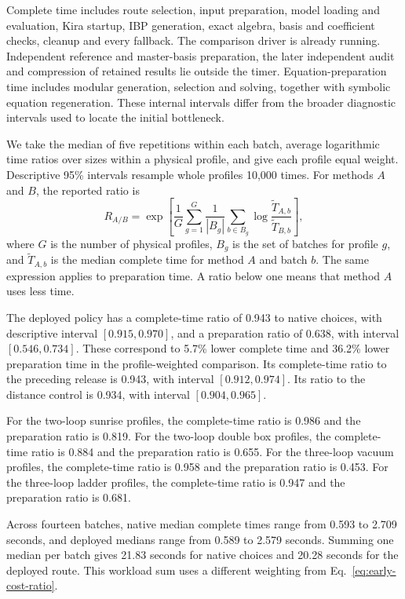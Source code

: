 Complete time includes route selection, input preparation, model loading
and evaluation, Kira startup, IBP generation, exact algebra, basis and
coefficient checks, cleanup and every fallback. The comparison driver is
already running. Independent reference and master-basis preparation,
the later independent audit and compression of retained results lie outside
the timer. Equation-preparation time includes modular generation,
selection and solving, together with symbolic equation regeneration.
These internal intervals differ from the broader diagnostic intervals
used to locate the initial bottleneck.

We take the median of five repetitions within each batch, average logarithmic
time ratios over sizes within a physical profile, and give each profile
equal weight. Descriptive 95\% intervals resample whole profiles
10,000 times. For methods $A$ and $B$, the reported ratio is
\begin{equation}
 R_{A/B}=
 \exp\!\left[
 \frac{1}{G}\sum_{g=1}^{G}\frac{1}{|B_g|}
 \sum_{b\in B_g}
 \log\frac{\widetilde T_{A,b}}{\widetilde T_{B,b}}
 \right],
 \label{eq:early-cost-ratio}
\end{equation}
where $G$ is the number of physical profiles, $B_g$ is the set of batches
for profile $g$, and $\widetilde T_{A,b}$ is the median complete time for
method $A$ and batch $b$. The same expression applies to preparation time.
A ratio below one means that method $A$ uses less time.

The deployed policy has a complete-time ratio of 0.943 to native choices, with descriptive interval $[0.915,0.970]$, and a preparation ratio of 0.638, with interval $[0.546,0.734]$. These correspond to 5.7\% lower complete time and 36.2\% lower preparation time in the profile-weighted comparison. Its complete-time ratio to the preceding release is 0.943, with interval $[0.912,0.974]$. Its ratio to the distance control is 0.934, with interval $[0.904,0.965]$.

For the two-loop sunrise profiles, the complete-time ratio is 0.986 and the preparation ratio is 0.819. For the two-loop double box profiles, the complete-time ratio is 0.884 and the preparation ratio is 0.655. For the three-loop vacuum profiles, the complete-time ratio is 0.958 and the preparation ratio is 0.453. For the three-loop ladder profiles, the complete-time ratio is 0.947 and the preparation ratio is 0.681. 

Across fourteen batches, native median complete times range from 0.593 to 2.709 seconds, and deployed medians range from 0.589 to 2.579 seconds. Summing one median per batch gives 21.83 seconds for native choices and 20.28 seconds for the deployed route. This workload sum uses a different weighting from Eq.~\eqref{eq:early-cost-ratio}.

